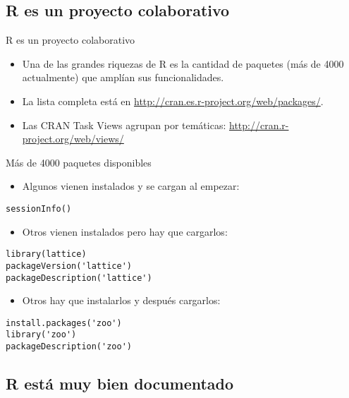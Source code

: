 \documentclass[xcolor={usenames,svgnames,dvipsnames}]{beamer}
\begin{document}
\subsection{R es un proyecto colaborativo}
\label{sec-1-2}
\begin{frame}[label=sec-1-2-1]{R es un proyecto colaborativo}
\begin{itemize}
\item Una de las grandes riquezas de R es la cantidad de paquetes (más
de 4000 actualmente) que amplían sus funcionalidades.
\item La lista completa está en \url{http://cran.es.r-project.org/web/packages/}.
\item Las CRAN Task Views agrupan por temáticas:
  \url{http://cran.r-project.org/web/views/}
\end{itemize}
\end{frame}
\begin{frame}[fragile,label=sec-1-2-2]{Más de 4000 paquetes disponibles}
 \begin{itemize}
\item Algunos vienen instalados y se cargan al empezar:
\end{itemize}
\lstset{language=R,numbers=none}
\begin{lstlisting}
sessionInfo()
\end{lstlisting}
\begin{itemize}
\item Otros vienen instalados pero hay que cargarlos:
\end{itemize}
\lstset{language=R,numbers=none}
\begin{lstlisting}
library(lattice)
packageVersion('lattice')
packageDescription('lattice')
\end{lstlisting}
\begin{itemize}
\item Otros hay que instalarlos y después cargarlos:
\end{itemize}
\lstset{language=R,numbers=none}
\begin{lstlisting}
install.packages('zoo')
library('zoo')
packageDescription('zoo')
\end{lstlisting}
\end{frame}
\subsection{R está muy bien documentado}
\label{sec-1-3}
\end{document}
